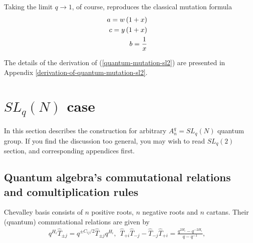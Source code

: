 \documentclass{article}
\newcommand{\lb}{\left (}
\newcommand{\rb}{\right )}
\newcommand{\be}{\begin{eqnarray}}
\newcommand{\ee}{\end{eqnarray}}
\newcommand {\?}{\textit{???}}
\newcommand{\hT}[0]{\hat{T}}
\newcommand{\hTp}[1][]{\hT_{+ #1}}
\newcommand{\hTm}[1][]{\hT_{- #1}}
\newcommand{\hTpm}[1][]{\hT_{\pm #1}}
\newcommand{\qH}[2][]{q^{#1H_{#2}}}
\def\classlim{q \rightarrow 1}
\newcommand{\delabel}[1]{(\ref{#1})}
\begin{document}
Taking the limit $\classlim$, of course, reproduces the classical mutation formula
\begin{align}
\label{classical-mutation-sl2}
\notag a = w \lb 1 + x\rb \\
c = y \lb 1 + x\rb \\
b = \frac{1}{x} \notag
\end{align}

The details of the derivation of \delabel{quantum-mutation-sl2} are presented in Appendix
\ref{derivation-of-quantum-mutation-sl2}.




\section {$SL_q(N)$ case}
\label{sec:slnq-case}
In this section describes the construction for arbitrary $A^q_{n} = SL_q(N)$ quantum group.
If you find the discussion too general, you may wish to read $SL_q(2)$ section, and corresponding appendices first.

\subsection{Quantum algebra's commutational relations and comultiplication rules}

Chevalley basis consists of $n$ positive roots, $n$ negative roots and $n$ cartans.
Their (quantum) commutational relations are given by
\be
\label{comm-relations-sln}
\qH{i} \hTpm[j] = q^{\pm C_{ij}/2} \hTpm[j] \qH{i},\ \ 
\hTp[i] \hTm[j] - \hTm[j] \hTp[i] = \frac{\qH[2]{i} - \qH[-2]{i}}{q - q^{-1}},
\ee
\end{document}
